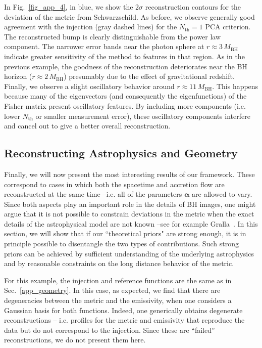 \documentclass[%
nofootinbib,
 amsmath,amssymb,
 aps,
floatfix,
twocolumn
]{revtex4-2}
\begin{document}
In Fig.~\ref{fig_app_4}, in blue, we show the 2\(\sigma\) reconstruction contours for the deviation of the metric from Schwarzschild. As before, we observe generally good agreement with the injection (gray dashed lines) for the \(N_\text{th} = 1\) PCA criterion. The reconstructed bump is clearly distinguishable from the power law component. The narrower error bands near the photon sphere at \(r \approx 3 \, M_\text{BH}\) indicate greater sensitivity of the method to features in that region. 
As in the previous example,  the goodness of the reconstruction deteriorates near the BH horizon (\(r \approx 2 \, M_\text{BH}\)) presumably due to the effect of gravitational redshift. 
Finally, we observe a slight oscillatory behavior around \(r \approx 11 \, M_\text{BH}\). This happens because many of the eigenvectors (and consequently the eigenfunctions) of the Fisher matrix present oscillatory features. By including more components (i.e. lower \(N_\text{th}\) or smaller  measurement error), these oscillatory components interfere and cancel out to give a better overall reconstruction. 

\subsection{Reconstructing Astrophysics and Geometry}\label{app_astro_geometry}

Finally, we will now present the most interesting results of our framework. These correspond to cases in which both the spacetime and accretion flow are 
reconstructed
at the same time --i.e. all of the parameters \(\boldsymbol{\alpha}\) are allowed to vary. 
Since both aspects play an important role in the details of BH images, one might argue that it is not possible to constrain deviations in the metric when the exact details of the astrophysical model are not known --see for example Gralla~\cite{Gralla:2020pra}. 
In this section, we will show that if our ``theoretical priors" are strong enough, it is in principle possible to disentangle the two types of contributions. Such strong priors can be achieved by sufficient understanding of the underlying astrophysics and by reasonable constraints on the long distance behavior of the metric. 

For this example, the injection and reference functions are the same as in Sec.~\ref{app_geometry}. 
In this case, as expected, we find that there are degeneracies between the metric and the emissivity, when one considers a Gaussian basis for both functions. Indeed, one generically obtains degenerate reconstructions -- i.e. profiles for the metric and emissivity that reproduce the data but do not correspond to the injection. Since these are ``failed'' reconstructions, we do not present them here.
\end{document}
